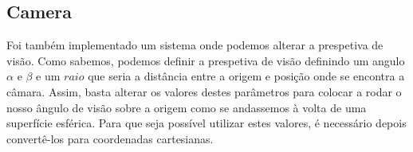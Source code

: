 \Huge\documentclass{article}
\begin{document}
\vspace{0.5cm}
\subsection{Camera}

Foi também implementado um sistema onde podemos alterar a prespetiva de visão.
Como sabemos, podemos definir a prespetiva de visão definindo um angulo $\alpha$ e $\beta$ e um $raio$ que seria a distância entre a origem e posição onde se encontra a câmara. Assim, basta alterar os valores destes parâmetros para colocar a rodar o nosso ângulo de visão sobre a origem como se andassemos à volta de uma superfície esférica. Para que seja possível utilizar estes valores, é necessário depois convertê-los para coordenadas cartesianas.
\end{document}
